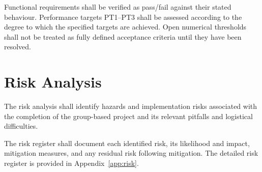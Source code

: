 Functional requirements shall be verified as pass/fail
against their stated behaviour. Performance targets PT1--PT3
shall be assessed according to the degree to which the
specified targets are achieved. Open numerical thresholds
shall not be treated as fully defined acceptance criteria
until they have been resolved.


\section{Risk Analysis}
\label{sec:risk-analysis}

The risk analysis shall identify hazards and implementation
risks associated with the completion of the group-based project and its relevant pitfalls and logistical difficulties.

The risk register shall document each identified risk,
its likelihood and impact, mitigation measures, and any
residual risk following mitigation. The detailed risk
register is provided in Appendix~\ref{app:risk}.

